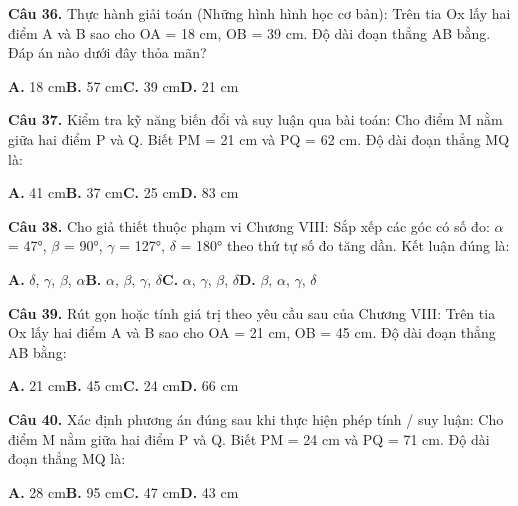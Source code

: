 \documentclass[11pt,a4paper]{article}
\begin{document}
\textbf{\color{primary} Câu 36.} Thực hành giải toán (Những hình hình học cơ bản): Trên tia Ox lấy hai điểm A và B sao cho OA = 18 cm, OB = 39 cm. Độ dài đoạn thẳng AB bằng. Đáp án nào dưới đây thỏa mãn?\par
\hspace*{1.5em}\textbf{A.} 18 cm\quad\quad \textbf{B.} 57 cm\quad\quad \textbf{C.} 39 cm\quad\quad \textbf{D.} 21 cm\par\vspace{2pt}
\textbf{\color{primary} Câu 37.} Kiểm tra kỹ năng biến đổi và suy luận qua bài toán: Cho điểm M nằm giữa hai điểm P và Q. Biết PM = 21 cm và PQ = 62 cm. Độ dài đoạn thẳng MQ là:\par
\hspace*{1.5em}\textbf{A.} 41 cm\quad\quad \textbf{B.} 37 cm\quad\quad \textbf{C.} 25 cm\quad\quad \textbf{D.} 83 cm\par\vspace{2pt}
\textbf{\color{primary} Câu 38.} Cho giả thiết thuộc phạm vi Chương VIII: Sắp xếp các góc có số đo: $\alpha$ = 47°, $\beta$ = 90°, $\gamma$ = 127°, $\delta$ = 180° theo thứ tự số đo tăng dần. Kết luận đúng là:\par
\hspace*{1.5em}\textbf{A.} $\delta$, $\gamma$, $\beta$, $\alpha$\quad\quad \textbf{B.} $\alpha$, $\beta$, $\gamma$, $\delta$\quad\quad \textbf{C.} $\alpha$, $\gamma$, $\beta$, $\delta$\quad\quad \textbf{D.} $\beta$, $\alpha$, $\gamma$, $\delta$\par\vspace{2pt}
\textbf{\color{primary} Câu 39.} Rút gọn hoặc tính giá trị theo yêu cầu sau của Chương VIII: Trên tia Ox lấy hai điểm A và B sao cho OA = 21 cm, OB = 45 cm. Độ dài đoạn thẳng AB bằng:\par
\hspace*{1.5em}\textbf{A.} 21 cm\quad\quad \textbf{B.} 45 cm\quad\quad \textbf{C.} 24 cm\quad\quad \textbf{D.} 66 cm\par\vspace{2pt}
\textbf{\color{primary} Câu 40.} Xác định phương án đúng sau khi thực hiện phép tính / suy luận: Cho điểm M nằm giữa hai điểm P và Q. Biết PM = 24 cm và PQ = 71 cm. Độ dài đoạn thẳng MQ là:\par
\hspace*{1.5em}\textbf{A.} 28 cm\quad\quad \textbf{B.} 95 cm\quad\quad \textbf{C.} 47 cm\quad\quad \textbf{D.} 43 cm\par\vspace{2pt}
\end{document}
